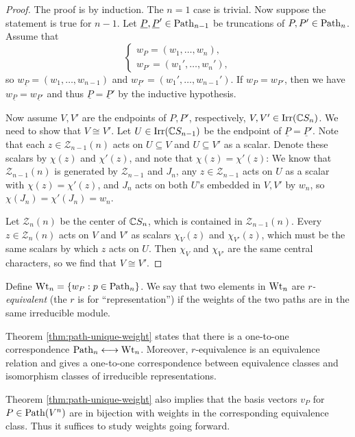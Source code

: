 \begin{proof}
  The proof is by induction. The
  $n = 1$ case is trivial. Now suppose
  the statement is true for $n - 1$.
  Let $\underline{P}, \underline{P}' \in \operatorname{Path}_{n - 1}$
  be truncations of $P, P' \in \operatorname{Path}_n$.
  Assume that
  \[
    \begin{cases}
      w_P = (w_1, \dots, w_n), \\
      w_{P'} = (w_1', \dots, w_n'),
    \end{cases}
  \]
  so $w_{\underline{P}} = (w_1, \dots, w_{n - 1})$
  and $w_{\underline{P}'} = (w_1', \dots, w_{n - 1}')$.
  If $w_P = w_{P'}$, then we have
  $w_{\underline{P}} = w_{\underline{P}'}$
  and thus $\underline{P} = \underline{P}'$
  by the inductive hypothesis.

  Now assume
  $V, V'$ are the endpoints of
  $P, P'$, respectively,
  $V, V' \in \operatorname{Irr}(\mathbb{C} S_n)$. We need
  to show that $V \cong V'$.
  Let $U \in \operatorname{Irr}(\mathbb{C} S_{n - 1})$
  be the endpoint of $\underline{P} = \underline{P}'$.
  Note that each $z \in \mathcal{Z}_{n - 1}(n)$
  acts on $U \subseteq V$ and $U \subseteq V'$ as a scalar.
  Denote these scalars by
  $\chi(z)$ and $\chi'(z)$, and note
  that $\chi(z) = \chi'(z)$:
  We know that $\mathcal{Z}_{n - 1}(n)$
  is generated by
  $\mathcal{Z}_{n - 1}$ and $J_n$, any
  $z \in \mathcal{Z}_{n - 1}$ acts on
  $U$ as a scalar with $\chi(z) = \chi'(z)$,
  and $J_n$ acts on both
  $U$'s embedded in $V, V'$ by $w_n$,
  so $\chi(J_n) = \chi'(J_n) = w_n$.

  Let $\mathcal{Z}_n(n)$ be the center of
  $\mathbb{C} S_n$, which is contained in
  $\mathcal{Z}_{n - 1}(n)$. Every
  $z \in \mathcal{Z}_n(n)$ acts on
  $V$ and $V'$ as scalars
  $\chi_V(z)$ and $\chi_{V'}(z)$,
  which must be the same scalars
  by which $z$ acts on $U$. Then
  $\chi_V$ and $\chi_{V'}$ are the
  same central characters, so we
  find that $V \cong V'$.
\end{proof}

\begin{definition}
  Define
  $\operatorname{Wt}_n = \{w_P : p \in \operatorname{Path}_n\}$.
  We say that two elements in
  $\operatorname{Wt}_n$ are \emph{$r$-equivalent}
  (the $r$ is for ``representation'')
  if the weights of the two paths
  are in the same irreducible module.
\end{definition}

\begin{remark}
  Theorem \ref{thm:path-unique-weight}
  states that there is a one-to-one
  correspondence
  $\operatorname{Path}_n \longleftrightarrow \operatorname{Wt}_n$.
  Moreover, $r$-equivalence is an
  equivalence relation and gives a
  one-to-one correspondence
  between equivalence classes and
  isomorphism classes of irreducible
  representations.

  Theorem \ref{thm:path-unique-weight} also
  implies that the basis vectors
  $v_P$ for $P \in \operatorname{Path}(V^n)$ are in
  bijection with weights in the
  corresponding equivalence class. Thus
  it suffices to study weights going
  forward.
\end{remark}

